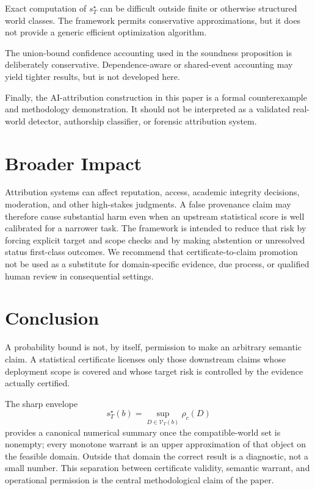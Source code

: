 \documentclass[10pt]{article}
\newcommand{\Vk}{\mathcal V_T}
\newcommand{\riskc}{\rho_c}
\begin{document}
Exact computation of \(s_T^\star\) can be difficult outside finite or otherwise
structured world classes.  The framework permits conservative approximations,
but it does not provide a generic efficient optimization algorithm.

The union-bound confidence accounting used in the soundness proposition is
deliberately conservative.  Dependence-aware or shared-event accounting may
yield tighter results, but is not developed here.

Finally, the AI-attribution construction in this paper is a formal
counterexample and methodology demonstration.  It should not be interpreted
as a validated real-world detector, authorship classifier, or forensic
attribution system.

\section{Broader Impact}

Attribution systems can affect reputation, access, academic integrity
decisions, moderation, and other high-stakes judgments.  A false provenance
claim may therefore cause substantial harm even when an upstream statistical
score is well calibrated for a narrower task.  The framework is intended to
reduce that risk by forcing explicit target and scope checks and by making
abstention or unresolved status first-class outcomes.  We recommend that
certificate-to-claim promotion not be used as a substitute for domain-specific
evidence, due process, or qualified human review in consequential settings.

\section{Conclusion}

A probability bound is not, by itself, permission to make an arbitrary
semantic claim.  A statistical certificate licenses only those downstream
claims whose deployment scope is covered and whose target risk is controlled
by the evidence actually certified.

The sharp envelope
\[
s_T^\star(b)
=
\sup_{D\in\Vk(b)}\riskc(D)
\]
provides a canonical numerical summary once the compatible-world set is
nonempty; every monotone warrant is an upper approximation of that object on
the feasible domain.  Outside that domain the correct result is a diagnostic,
not a small number.  This separation between certificate validity, semantic
warrant, and operational permission is the central methodological claim of the
paper.



\end{document}
